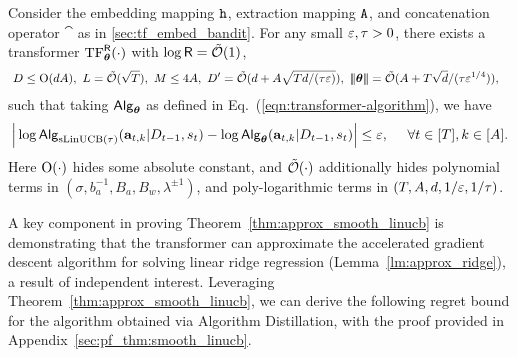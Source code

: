 \begin{theorem}\label{thm:approx_smooth_linucb}
Consider the embedding mapping ${\tt h}$, extraction mapping ${\tt A}$, and concatenation operator $\cat$ as in \ref{sec:tf_embed_bandit}. For any small $\varepsilon,{\tau}>0$, there exists a transformer ${\rm TF}_{\boldsymbol \theta}^{{\mathsf{R}}}(\cdot)$ with $\log {\mathsf{R}} = {\tilde{\mathcal O}}(1)$, 
\begin{equation}
\begin{aligned}
&~D \le {\mathrm{O}}(d{A}),~ {L}=\tilde {\mathcal{O}}(\sqrt{{T}}),~ M \le 4{A},~D' = {\tilde{\mathcal O}}(d+A\sqrt{Td/({\tau}\varepsilon)}), ~{\left|\!\left|\!\left|{{{\boldsymbol \theta}}}\right|\!\right|\!\right|} = {\tilde{\mathcal O}}({A}+{T}\sqrt{d}/({\tau}\varepsilon^{1/4})), \label{eq:linucb_tf_param} 
\end{aligned}
\end{equation}
such that taking ${\mathsf{Alg}}_{{{\boldsymbol \theta}}}$ as defined in Eq.~(\ref{eqn:transformer-algorithm}), we have
\[
\Big|\log {\mathsf{Alg}}_{{\mathrm{sLinUCB}}(\tau)}({\mathbf a}_{t,k}|{D}_{t-1},{s}_t) - \log {\mathsf{Alg}}_{{{\boldsymbol \theta}}}({\mathbf a}_{t,k}|{D}_{t-1},{s}_t) \Big|\leq \varepsilon, ~~~~\forall t\in[{T}],k\in[{A}].
\]
Here ${\mathrm{O}}(\cdot)$ hides some absolute constant, and  $\tilde {\mathcal{O}}(\cdot)$ additionally hides polynomial terms in $(\sigma, b_a^{-1}, B_a, B_w, \lambda^{\pm1})$, and poly-logarithmic terms in $({T}, {A}, d, 1/\varepsilon,1/{\tau})$. 
\end{theorem}


A key component in proving Theorem~\ref{thm:approx_smooth_linucb} is demonstrating that the transformer can approximate the accelerated gradient descent algorithm for solving linear ridge regression (Lemma~\ref{lm:approx_ridge}), a result of independent interest. Leveraging Theorem~\ref{thm:approx_smooth_linucb}, we can derive the following regret bound for the algorithm obtained via Algorithm Distillation, with the proof provided in Appendix~\ref{sec:pf_thm:smooth_linucb}.

